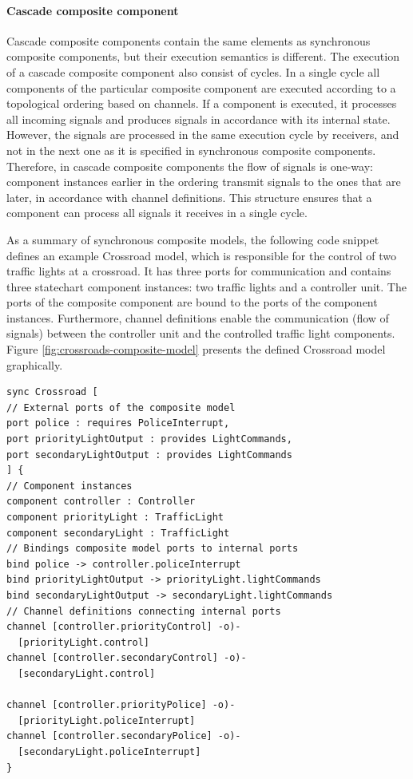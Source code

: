 \paragraph{Cascade composite component} Cascade composite components contain the same elements
as synchronous composite components, but their execution semantics is different. The
execution of a cascade composite component also consist of cycles. In a single cycle all components
of the particular composite component are executed according to a topological ordering
based on channels. If a component is executed, it processes all incoming signals and produces
signals in accordance with its internal state. However, the signals are processed in the same
execution cycle by receivers, and not in the next one as it is specified in synchronous composite
components. Therefore, in cascade composite components the flow of signals is one-way:
component instances earlier in the ordering transmit signals to the ones that are later, in
accordance with channel definitions. This structure ensures that a component can process all
signals it receives in a single cycle.

As a summary of synchronous composite models, the following code snippet defines an example Crossroad model, which is responsible for the control of two traffic lights at a crossroad. It has three ports for communication and contains three statechart component instances: two traffic lights and a controller unit. The ports of the composite component are bound to the ports of the component instances. Furthermore, channel definitions enable the communication (flow of signals) between the controller unit and the controlled traffic light components. Figure \ref{fig:crossroads-composite-model} presents the defined Crossroad model graphically.
\begin{lstlisting}
sync Crossroad [
// External ports of the composite model
port police : requires PoliceInterrupt,
port priorityLightOutput : provides LightCommands,
port secondaryLightOutput : provides LightCommands
] {
// Component instances
component controller : Controller
component priorityLight : TrafficLight
component secondaryLight : TrafficLight
// Bindings composite model ports to internal ports
bind police -> controller.policeInterrupt
bind priorityLightOutput -> priorityLight.lightCommands
bind secondaryLightOutput -> secondaryLight.lightCommands
// Channel definitions connecting internal ports
channel [controller.priorityControl] -o)-
  [priorityLight.control]
channel [controller.secondaryControl] -o)-
  [secondaryLight.control]

channel [controller.priorityPolice] -o)-
  [priorityLight.policeInterrupt]
channel [controller.secondaryPolice] -o)-
  [secondaryLight.policeInterrupt]
}
\end{lstlisting}

